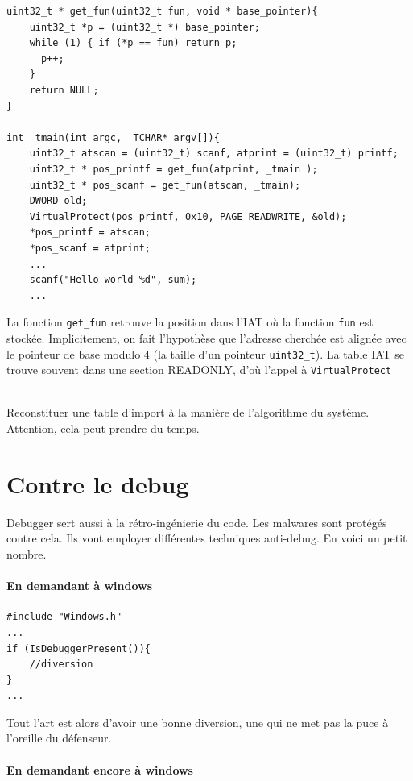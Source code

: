 \documentclass{book}
\newenvironment{commentaire}[1]{%
	\def\FrameCommand{\fboxrule=\FrameRule\fboxsep=\FrameSep \fcolorbox{yellow!50}{yellow!10}}%
	\MakeFramed {\advance\hsize-\width \FrameRestore}
	\noindent {\bf #1}\\
}%
{\endMakeFramed}
\newcommand{\code}[1]{\texttt{#1}}
\newcommand{\Windows}{{\sc windows}}
\begin{document}
\begin{verbatim}
uint32_t * get_fun(uint32_t fun, void * base_pointer){
	uint32_t *p = (uint32_t *) base_pointer;
	while (1) { if (*p == fun) return p;
	  p++;
	}
	return NULL;
}

int _tmain(int argc, _TCHAR* argv[]){
	uint32_t atscan = (uint32_t) scanf, atprint = (uint32_t) printf;
	uint32_t * pos_printf = get_fun(atprint, _tmain );
	uint32_t * pos_scanf = get_fun(atscan, _tmain);
	DWORD old;
	VirtualProtect(pos_printf, 0x10, PAGE_READWRITE, &old);
	*pos_printf = atscan;
	*pos_scanf = atprint;
	...
	scanf("Hello world %d", sum);
	...
\end{verbatim}

La fonction \code{get\_fun} retrouve la position dans l'IAT où la fonction \code{fun} est stockée. Implicitement, on fait l'hypothèse que l'adresse cherchée est alignée avec le pointeur de base modulo 4 (la taille d'un pointeur \code{uint32\_t}). La table IAT se trouve souvent dans une section READONLY, d'où l'appel à \code{VirtualProtect}


\begin{commentaire}{Pour aller plus loin}
	Reconstituer une table d'import à la manière de l'algorithme du système. Attention, cela peut prendre du temps. 
\end{commentaire}

\section{Contre le debug}

Debugger sert aussi à la rétro-ingénierie du code. Les malwares sont protégés contre cela. Ils vont employer différentes techniques anti-debug. En voici un petit nombre. 

\paragraph{En demandant à \Windows}

\begin{verbatim}
#include "Windows.h"
...
if (IsDebuggerPresent()){
	//diversion
}
...
\end{verbatim}

Tout l'art est alors d'avoir une bonne diversion, une qui ne met pas la puce à l'oreille du défenseur. 

\paragraph{En demandant encore à \Windows}
\end{document}
